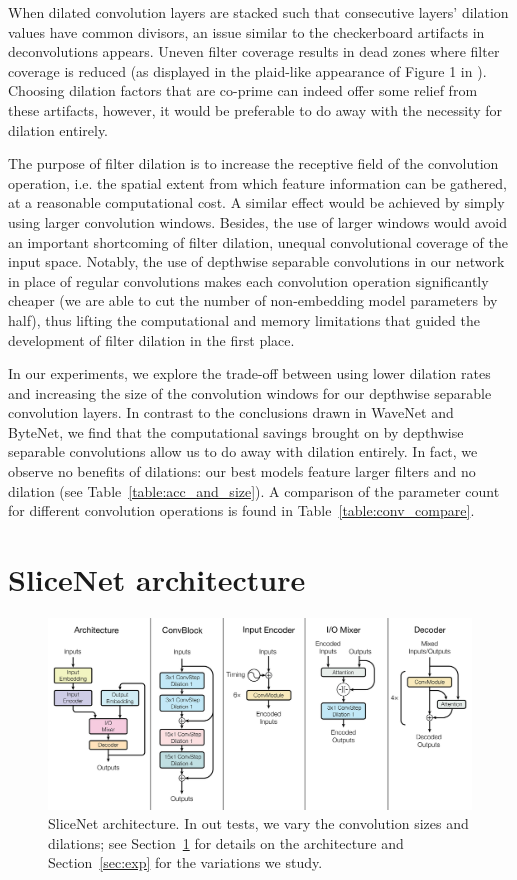 \documentclass{article}
\begin{document}
When dilated convolution layers are stacked such that consecutive layers' dilation values have common divisors, an issue similar to the checkerboard artifacts in deconvolutions \citep{odena2016deconvolution} appears. Uneven filter coverage results in dead zones where filter coverage is reduced (as displayed in the plaid-like appearance of Figure 1 in \citep{dilatedconv2015}). Choosing dilation factors that are co-prime can indeed offer some relief from these artifacts, however, it would be preferable to do away with the necessity for dilation entirely.

The purpose of filter dilation is to increase the receptive field of the convolution operation, i.e. the spatial extent from which feature information can be gathered, at a reasonable computational cost. A similar effect would be achieved by simply using larger convolution windows. Besides, the use of larger windows would avoid an important shortcoming of filter dilation, unequal convolutional coverage of the input space. Notably, the use of depthwise separable convolutions in our network in place of regular convolutions makes each convolution operation significantly cheaper (we are able to cut the number of non-embedding model parameters by half), thus lifting the computational and memory limitations that guided the development of filter dilation in the first place.

In our experiments, we explore the trade-off between using lower dilation rates and increasing the size of the convolution windows for our depthwise separable convolution layers. In contrast to the conclusions drawn in WaveNet and ByteNet, we find that the computational savings brought on by depthwise separable convolutions allow us to do away with dilation entirely. In fact, we observe no benefits of dilations: our best models feature larger filters and no dilation (see Table~\ref{table:acc_and_size}). A comparison of the parameter count for different convolution operations is found in Table~\ref{table:conv_compare}.

\section{SliceNet architecture} \label{sec:arch}

\begin{figure}
  \centering
  \includegraphics[scale=0.40]{ModalNet-18.png}
  \caption{SliceNet architecture. In out tests, we vary the convolution sizes and dilations;
    see Section~\ref{sec:arch} for details on the architecture and Section~\ref{sec:exp} for the variations we study.}
  \label{modelfig}
\end{figure}
\end{document}
